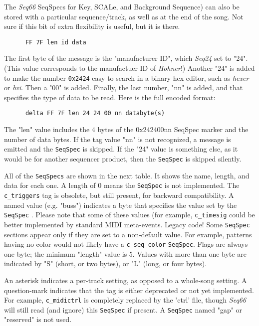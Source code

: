    The \textsl{Seq66} SeqSpecs for Key, SCALe, and Background Sequence)
   can also be stored with a particular sequence/track,
   as well as at the end of the song.
   Not sure if this bit of extra
   flexibility is useful, but it is there.

   \begin{verbatim}
      FF 7F len id data
   \end{verbatim}

   The first byte of the message is the "manufacturer ID",
   which \textsl{Seq24} set to "24".
   (This value corresponds to the manufactuer ID of \textsl{Hohner}!)
   Another "24" is added to make the number \texttt{0x2424}
   easy to search in a binary hex editor, such as \textsl{hexer} or
   \textsl{bvi}.
   Then a "00" is added.  Finally, the last number, "nn" is added, and that
   specifies the type of data to be read.  Here is the full encoded
   format:

   \begin{verbatim}
      delta FF 7F len 24 24 00 nn databyte(s)
   \end{verbatim}

   The "len" value includes the 4 bytes of the 0x242400nn
   SeqSpec marker and the number of data bytes.
   If the tag value "nn" is not recognized, a message is emitted and the
   \texttt{SeqSpec} is skipped.  If the "24" value is something else, as it
   would be for another sequencer product, then the
   \texttt{SeqSpec} is skipped silently.

   All of the
   \texttt{SeqSpecs} are shown in the next table. It shows the name, length,
   and data for each one. A length of 0 means the
   \texttt{SeqSpec} is not implemented.
   The \texttt{c\_triggers} tag is obsolete, but still present, for
   backward compatibility.
   A named value (e.g. "buss") indicates a byte that specifies the value set by
   the \texttt{SeqSpec} .
   Please note that some of these values (for example, \texttt{c\_timesig}
   could be better implemented by standard MIDI meta-events. Legacy code!
   Some \texttt{SeqSpec} sections appear only if they are set to a non-default
   value.
   For example, patterns having no color would not likely have a
   \texttt{c\_seq\_color} \texttt{SeqSpec}.
   Flags are always one byte; the minimum "length" value is 5.
   Values with more than one byte are indicated by "S" (short, or two bytes),
   or "L" (long, or four bytes).

   An asterisk indicates a per-track setting, as
   opposed to a whole-song setting. A question-mark indicates that the tag is
   either deprecated or not yet implemented.
   For example, \texttt{c\_midictrl} is completely replaced by the
   'ctrl' file, though \textsl{Seq66} will still read (and ignore)
   this \texttt{SeqSpec} if present.
   A \texttt{SeqSpec} named "gap" or "reserved" is not used.

